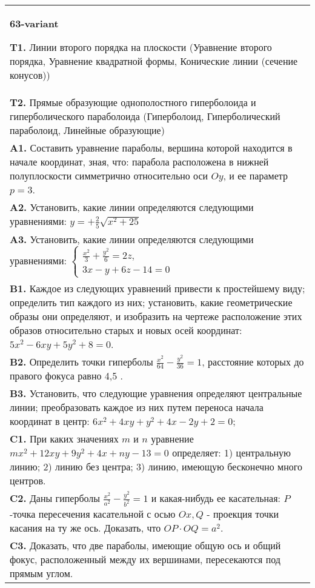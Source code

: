\documentclass{article}
\begin{document}
\begin{tabular}{m{17cm}}
\textbf{63-variant}
\newline

\textbf{T1.} Линии второго порядка на плоскости (Уравнение второго порядка, Уравнение квадратной формы, Конические линии (сечение конусов)) \\
\textbf{T2.} Прямые образующие однополостного гиперболоида и гиперболического параболоида (Гиперболоид, Гиперболический параболоид, Линейные образующие) \\
\textbf{A1.} Составить уравнение параболы, вершина которой находится в начале координат, зная, что: парабола расположена в нижней полуплоскости симметрично относительно оси $O y$, и ее параметр $p=3$. \\
\textbf{A2.} Установить, какие линии определяются следующими уравнениями: $y=+\frac{2}{5} \sqrt{x^2+25}$ \\
\textbf{A3.} Установить, какие линии определяются следующими уравнениями: $\left\{\begin{array}{l}\frac{x^2}{3}+\frac{y^2}{6}=2 z, \\ 3 x-y+6 z-14=0\end{array}\right.$ \\
\textbf{B1.} Каждое из следующих уравнений привести к простейшему виду; определить тип каждого из них; установить, какие геометрические образы они определяют, и изобразить на чертеже расположение этих образов относительно старых и новых осей координат: $5 x^2-6 x y+5 y^2+8=0$. \\
\textbf{B2.} Определить точки гиперболы $\frac{x^2}{64}-\frac{y^2}{36}=1$, расстояние которых до правого фокуса равно 4,5 . \\
\textbf{B3.} Установить, что следующие уравнения определяют центральные линии; преобразовать каждое из них путем переноса начала координат в центр: $6 x^2+4 x y+y^2+4 x-2 y+2=0$; \\
\textbf{C1.} При каких значениях $m$ и $n$ уравнение $m x^2+12 x y+9 y^2+4 x+n y-13=0$ определяет: 1) центральную линию; 2) линию без центра; 3) линию, имеющую бесконечно много центров. \\
\textbf{C2.} Даны гиперболы $\frac{x^2}{a^2}-\frac{y^2}{b^2}=1$ и какая-нибудь ее касательная: $P$-точка пересечения касательной с осью $O x, Q$ - проекция точки касания на ту же ось. Доказать, что $O P \cdot O Q=a^2$. \\
\textbf{C3.} Доказать, что две параболы, имеющие общую ось и общий фокус, расположенный между их вершинами, пересекаются под прямым углом. \\

\end{tabular}
\vspace{1cm}
\end{document}
